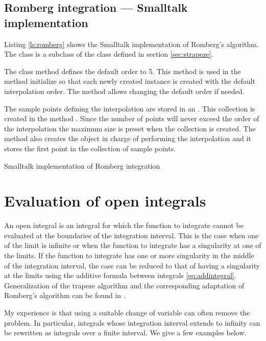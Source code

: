 \subsection{Romberg integration --- Smalltalk implementation}
\label{sec:sromberg} Listing \ref{ls:romberg} shows the Smalltalk
implementation of Romberg's algorithm. The class  is a subclass of the class  defined in section \ref{sec:strapeze}.

The class method  defines the default order to
5. This method is used in the method initialize so that each newly
created instance is created with the default interpolation order.
The method  allows changing the default order if
needed.

The sample points defining the interpolation are stored in an . This collection is created in the method . Since the number of points will never
exceed the order of the interpolation the maximum size is preset
when the collection is created. The method  also creates the object in charge of
performing the interpolation and it stores the first point in the
collection of sample points.
\begin{listing} Smalltalk implementation of Romberg integration \label{ls:romberg}

\end{listing}

\section{Evaluation of open integrals}
An open integral is an integral for which the function to
integrate cannot be evaluated at the boundaries of the integration
interval. This is the case when one of the limit is infinite or
when the function to integrate has a singularity at one of the
limits. If the function to integrate has one or more singularity
in the middle of the integration interval, the case can be reduced
to that of having a singularity at the limits using the additive
formula between integrals \ref{eq:addintegral}. Generalization of
the trapeze algorithm and the corresponding adaptation of
Romberg's algorithm can be found in \cite{Press}.

 My experience is that using a suitable
change of variable can often remove the problem. In particular,
integrals whose integration interval extends to infinity can be
rewritten as integrals over a finite interval. We give a few
examples below.

